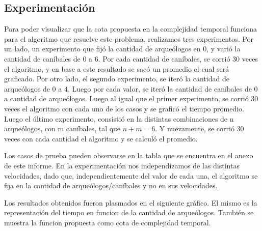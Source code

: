 
    \subsection{Experimentación}

	Para poder visualizar que la cota propuesta en la complejidad temporal funciona para el algoritmo que resuelve este problema, realizamos tres experimentos. Por un lado, un experimento que fijó la cantidad de arqueólogos en 0, y varió la cantidad de caníbales de 0 a 6. Por cada cantidad de caníbales, se corrió 30 veces el algoritmo, y en base a este resultado se sacó un promedio el cual será graficado. Por otro lado,  el segundo experimento, se iteró la cantidad de arqueólogos de 0 a 4. Luego por cada valor, se iteró la cantidad de caníbales de 0 a cantidad de arqueólogos. Luego al igual que el primer experimento, se corrió 30 veces el algoritmo con cada uno de los casos y se graficó el tiempo promedio. Luego el último experimento, consistió en la distintas combinaciones de n arqueólogos, con m caníbales, tal que $n+m = 6$. Y nuevamente, se corrió 30 veces con cada cantidad el algoritmo y se calculó el promedio.

  Los casos de prueba pueden observarse en la tabla que se encuentra en el anexo de este informe. En la experimentación nos independizamos de las distintas velocidades, dado que, independientemente del valor de cada una, el algoritmo se fija en la cantidad de arqueólogos/caníbales y no en sus velocidades.

  Los resultados obtenidos fueron plasmados en el siguiente gráfico. El mismo es la representación del tiempo en funcion de la cantidad de arqueólogos. También se muestra la funcion propuesta como cota de complejidad temporal.

